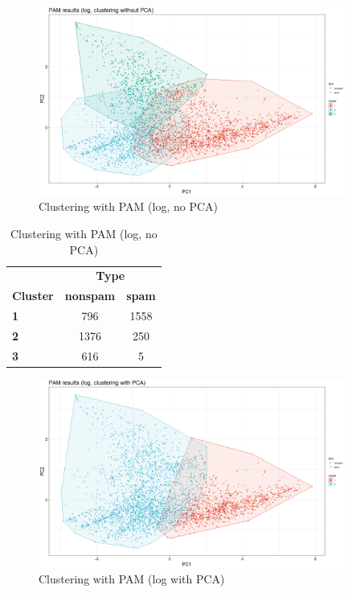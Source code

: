 \documentclass{article}
\begin{document}
	\begin{figure}[h]
		\centering
		\includegraphics[width=0.9\textwidth]{proj2_plots/pam_res_log.png}
		\caption{Clustering with PAM (log, no PCA)}
		\label{fig::clust_pam_log}
	\end{figure}
	
	\begin{table}[h]
		\centering
		\begin{tabular}{lcc}
			& \multicolumn{2}{c}{\textbf{Type}} \\
			\textbf{Cluster} & \textbf{nonspam} & \textbf{spam} \\
			\textbf{1} & 796 & 1558 \\
			\textbf{2} & 1376 & 250 \\
			\textbf{3} & 616 & 5 \\
		\end{tabular}
		\caption{Clustering with PAM (log, no PCA)}
		\label{tab::clust_pam_log}
	\end{table}
	
	\begin{figure}[h]
		\centering
		\includegraphics[width=0.9\textwidth]{proj2_plots/pam_res_log_pca.png}
		\caption{Clustering with PAM (log with PCA)}
		\label{fig::clust_pam_log_pca}
	\end{figure}
	
\end{document}
